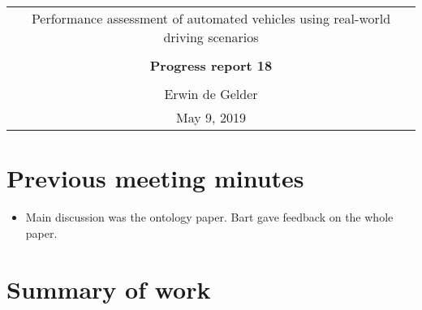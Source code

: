 \documentclass[10pt,final,a4paper,oneside,onecolumn]{article}
\newcommand{\progressreportnumber}{18}
\renewcommand{\author}{Erwin de Gelder}
\renewcommand{\date}{May 9, 2019}
\renewcommand{\title}{Performance assessment of automated vehicles using real-world driving scenarios}
\begin{document}
	
\begin{center}
	\begin{tabular}{c}
		\title \\ \\
		\textbf{\huge Progress report \progressreportnumber} \\ \\
		\author \\ 
		\date
	\end{tabular}
\end{center}

\section{Previous meeting minutes}

\begin{itemize}
	\item Main discussion was the ontology paper. Bart gave feedback on the whole paper.
\end{itemize}

\section{Summary of work}
\end{document}
